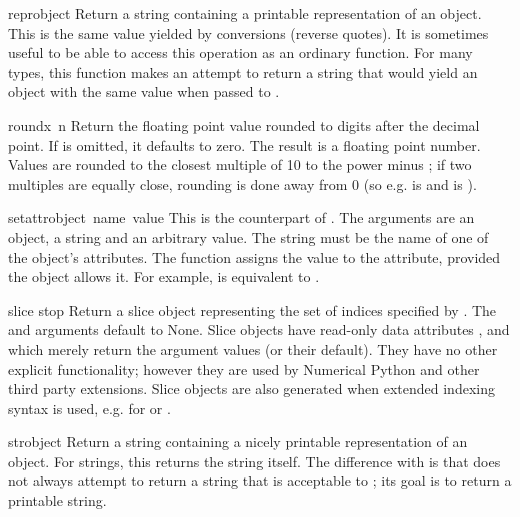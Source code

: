\begin{funcdesc}{repr}{object}
Return a string containing a printable representation of an object.
This is the same value yielded by conversions (reverse quotes).
It is sometimes useful to be able to access this operation as an
ordinary function.  For many types, this function makes an attempt
to return a string that would yield an object with the same value
when passed to .
\end{funcdesc}

\begin{funcdesc}{round}{x\, n}
  Return the floating point value  rounded to  digits
  after the decimal point.  If  is omitted, it defaults to zero.
  The result is a floating point number.  Values are rounded to the
  closest multiple of 10 to the power minus ; if two multiples
  are equally close, rounding is done away from 0 (so e.g.
   is  and  is ).
\end{funcdesc}

\begin{funcdesc}{setattr}{object\, name\, value}
  This is the counterpart of .  The arguments are an
  object, a string and an arbitrary value.  The string must be the name
  of one of the object's attributes.  The function assigns the value to
  the attribute, provided the object allows it.  For example,
   is equivalent to
  .
\end{funcdesc}

\begin{funcdesc}{slice}{ stop}
Return a slice object representing the set of indices specified by
.  The 
and  arguments default to None.  Slice objects have
read-only data attributes ,  and 
which merely return the argument values (or their default).  They have
no other explicit functionality; however they are used by Numerical
Python and other third party extensions.  Slice objects are also
generated when extended indexing syntax is used, e.g. for
 or .
\end{funcdesc}

\begin{funcdesc}{str}{object}
Return a string containing a nicely printable representation of an
object.  For strings, this returns the string itself.  The difference
with  is that  does not
always attempt to return a string that is acceptable to ;
its goal is to return a printable string.
\end{funcdesc}

